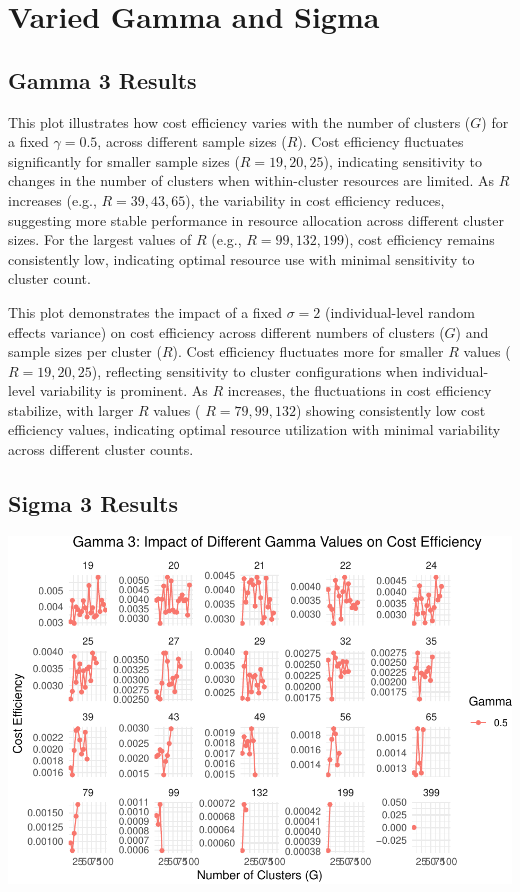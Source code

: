 \documentclass[
]{article}
\begin{document}
\hypertarget{varied-gamma-and-sigma}{%
\section{Varied Gamma and Sigma}\label{varied-gamma-and-sigma}}

\hypertarget{gamma-3-results}{%
\subsection{Gamma 3 Results}\label{gamma-3-results}}

This plot illustrates how cost efficiency varies with the number of
clusters (\(G\)) for a fixed \(\gamma = 0.5\), across different sample
sizes (\(R\)). Cost efficiency fluctuates significantly for smaller
sample sizes (\(R = 19, 20, 25\)), indicating sensitivity to changes in
the number of clusters when within-cluster resources are limited. As
\(R\) increases (e.g., \(R = 39, 43, 65\)), the variability in cost
efficiency reduces, suggesting more stable performance in resource
allocation across different cluster sizes. For the largest values of
\(R\) (e.g., \(R = 99, 132, 199\)), cost efficiency remains consistently
low, indicating optimal resource use with minimal sensitivity to cluster
count.

This plot demonstrates the impact of a fixed \(\sigma = 2\)
(individual-level random effects variance) on cost efficiency across
different numbers of clusters (\(G\)) and sample sizes per cluster
(\(R\)). Cost efficiency fluctuates more for smaller \(R\) values (
\(R = 19, 20, 25\)), reflecting sensitivity to cluster configurations
when individual-level variability is prominent. As \(R\) increases, the
fluctuations in cost efficiency stabilize, with larger \(R\) values (
\(R = 79, 99, 132\)) showing consistently low cost efficiency values,
indicating optimal resource utilization with minimal variability across
different cluster counts.

\hypertarget{sigma-3-results}{%
\subsection{Sigma 3 Results}\label{sigma-3-results}}

\begin{center}\includegraphics{Project3Simulation_files/figure-latex/unnamed-chunk-10-1} \end{center}
\end{document}
